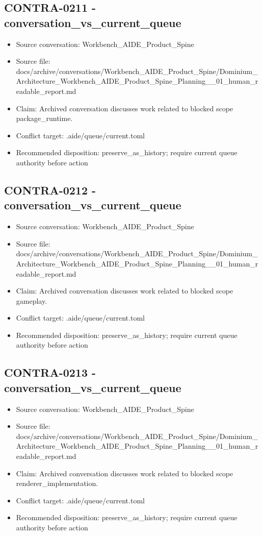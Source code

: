 \documentclass[11pt,a4paper]{report}
\begin{document}
\subsection{CONTRA-0211 - conversation\_vs\_current\_queue}

\begin{itemize}
\item Source conversation: Workbench\_AIDE\_Product\_Spine
\item Source file: docs/archive/conversations/Workbench\_AIDE\_Product\_Spine/Dominium\_Architecture\_Workbench\_AIDE\_Product\_Spine\_Planning\_\_01\_human\_readable\_report.md
\item Claim: Archived conversation discusses work related to blocked scope package\_runtime.
\item Conflict target: .aide/queue/current.toml
\item Recommended disposition: preserve\_as\_history; require current queue authority before action
\end{itemize}

\subsection{CONTRA-0212 - conversation\_vs\_current\_queue}

\begin{itemize}
\item Source conversation: Workbench\_AIDE\_Product\_Spine
\item Source file: docs/archive/conversations/Workbench\_AIDE\_Product\_Spine/Dominium\_Architecture\_Workbench\_AIDE\_Product\_Spine\_Planning\_\_01\_human\_readable\_report.md
\item Claim: Archived conversation discusses work related to blocked scope gameplay.
\item Conflict target: .aide/queue/current.toml
\item Recommended disposition: preserve\_as\_history; require current queue authority before action
\end{itemize}

\subsection{CONTRA-0213 - conversation\_vs\_current\_queue}

\begin{itemize}
\item Source conversation: Workbench\_AIDE\_Product\_Spine
\item Source file: docs/archive/conversations/Workbench\_AIDE\_Product\_Spine/Dominium\_Architecture\_Workbench\_AIDE\_Product\_Spine\_Planning\_\_01\_human\_readable\_report.md
\item Claim: Archived conversation discusses work related to blocked scope renderer\_implementation.
\item Conflict target: .aide/queue/current.toml
\item Recommended disposition: preserve\_as\_history; require current queue authority before action
\end{itemize}
\end{document}
